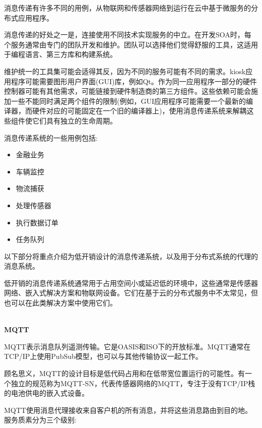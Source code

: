
消息传递有许多不同的用例，从物联网和传感器网络到运行在云中基于微服务的分布式应用程序。

消息传递的好处之一是，连接使用不同技术实现服务的中立。在开发SOA时，每个服务通常由专门的团队开发和维护。团队可以选择他们觉得舒服的工具，这适用于编程语言、第三方库和构建系统。

维护统一的工具集可能会适得其反，因为不同的服务可能有不同的需求。kiosk应用程序可能需要图形用户界面(GUI)库，例如Qt。作为同一应用程序一部分的硬件控制器可能有其他需求，可能链接到硬件制造商的第三方组件。这些依赖可能会施加一些不能同时满足两个组件的限制(例如，GUI应用程序可能需要一个最新的编译器，而硬件对应的可能固定在一个旧的编译器上)，使用消息传递系统来解耦这些组件使它们具有独立的生命周期。

消息传递系统的一些用例包括:

\begin{itemize}
\item 
金融业务

\item 
车辆监控

\item 
物流捕获

\item 
处理传感器

\item 
执行数据订单

\item 
任务队列
\end{itemize}

以下部分将重点介绍为低开销设计的消息传递系统，以及用于分布式系统的代理的消息系统。


低开销的消息传递系统通常用于占用空间小或延迟低的环境中，这些通常是传感器网络、嵌入式解决方案和物联网设备。它们在基于云的分布式服务中不太常见，但也可以在此类解决方案中使用它们。

\hspace*{\fill} \\ %
\noindent
\textbf{MQTT}

MQTT表示消息队列遥测传输。它是OASIS和ISO下的开放标准。MQTT通常在TCP/IP上使用PubSub模型，也可以与其他传输协议一起工作。

顾名思义，MQTT的设计目标是低代码占用和在低带宽位置运行的可能性。有一个独立的规范称为MQTT-SN，代表传感器网络的MQTT，专注于没有TCP/IP栈的电池供电的嵌入式设备。

MQTT使用消息代理接收来自客户机的所有消息，并将这些消息路由到目的地。服务质素分为三个级别:

